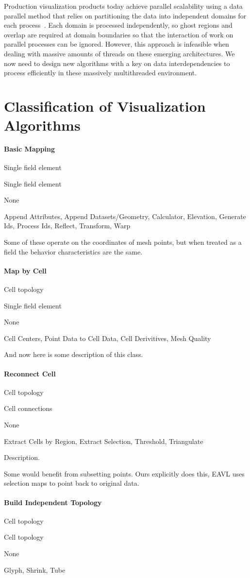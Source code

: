 \documentclass{sig-alternate}
\newcommand*{\lcite}[1]{~\cite{#1}}
\newcommand{\algorithmclasssection}[1]{\paragraph{#1}}
\newcommand{\algorithmclass}[5]{
  \algorithmclasssection{#1} %
  \begin{description}[leftmargin=4.5em,style=nextline,noitemsep]
  \item[Input] #2
  \item[Output] #3
  \item[Overlap] #4
  \item[Algorithms] #5
  \end{description}
}
\begin{document}
Production visualization products today achieve parallel scalability using
a data parallel method that relies on partitioning the data into
independent domains for each process\lcite{Ahrens2001}. Each domain is
processed independently, so ghost regions and overlap are required at
domain boundaries so that the interaction of work on parallel processes can
be ignored. However, this approach is infeasible when dealing with massive
amounts of threads on these emerging architectures. We now need to design
new algorithms with a key on data interdependencies to process efficiently
in these massively multithreaded environment.

\section{Classification of Visualization Algorithms}


\algorithmclass{Basic Mapping}
               {Single field element} %
               {Single field element} %
               {None} %
               {Append Attributes, Append Datasets/Geometry, Calculator,
                 Elevation, Generate Ids, Process Ids, Reflect, Transform,
                 Warp}

\noindent
Some of these operate on the coordinates of mesh points, but when treated
as a field the behavior characteristics are the same.


\algorithmclass{Map by Cell}
               {Cell topology} %
               {Single field element} %
               {None} %
               {Cell Centers, Point Data to Cell Data, Cell Derivitives,
                 Mesh Quality}

\noindent
And now here is some description of this class.


\algorithmclass{Reconnect Cell}
               {Cell topology} %
               {Cell connections} %
               {None} %
               {Extract Cells by Region, Extract Selection, Threshold,
                 Triangulate}

\noindent
Description.

Some would benefit from subsetting points. Ours explicitly does this, EAVL
uses selection maps to point back to original data.


\algorithmclass{Build Independent Topology}
               {Cell topology} %
               {Cell topology} %
               {None} %
               {Glyph, Shrink, Tube}
\end{document}
